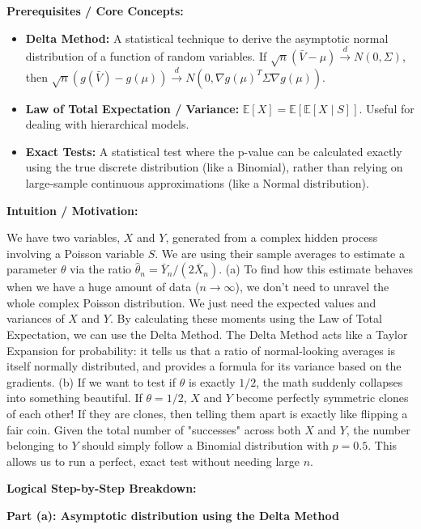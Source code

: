 \begin{solution}
\textbf{Prerequisites / Core Concepts:}
\begin{itemize}
    \item \textbf{Delta Method:} A statistical technique to derive the asymptotic normal distribution of a function of random variables. If $\sqrt{n}(\bar{V} - \mu) \xrightarrow{d} N(0, \Sigma)$, then $\sqrt{n}(g(\bar{V}) - g(\mu)) \xrightarrow{d} N(0, \nabla g(\mu)^T \Sigma \nabla g(\mu))$.
    \item \textbf{Law of Total Expectation / Variance:} $\mathbb{E}[X] = \mathbb{E}[\mathbb{E}[X \mid S]]$. Useful for dealing with hierarchical models.
    \item \textbf{Exact Tests:} A statistical test where the p-value can be calculated exactly using the true discrete distribution (like a Binomial), rather than relying on large-sample continuous approximations (like a Normal distribution).
\end{itemize}

\textbf{Intuition / Motivation:}

We have two variables, $X$ and $Y$, generated from a complex hidden process involving a Poisson variable $S$. We are using their sample averages to estimate a parameter $\theta$ via the ratio $\hat{\theta}_n = \bar{Y}_n / (2\bar{X}_n)$.
(a) To find how this estimate behaves when we have a huge amount of data ($n \to \infty$), we don't need to unravel the whole complex Poisson distribution. We just need the expected values and variances of $X$ and $Y$. By calculating these moments using the Law of Total Expectation, we can use the Delta Method. The Delta Method acts like a Taylor Expansion for probability: it tells us that a ratio of normal-looking averages is itself normally distributed, and provides a formula for its variance based on the gradients.
(b) If we want to test if $\theta$ is exactly $1/2$, the math suddenly collapses into something beautiful. If $\theta=1/2$, $X$ and $Y$ become perfectly symmetric clones of each other! If they are clones, then telling them apart is exactly like flipping a fair coin. Given the total number of "successes" across both $X$ and $Y$, the number belonging to $Y$ should simply follow a Binomial distribution with $p=0.5$. This allows us to run a perfect, exact test without needing large $n$.

\textbf{Logical Step-by-Step Breakdown:}

\textbf{Part (a): Asymptotic distribution using the Delta Method}


\end{solution}
